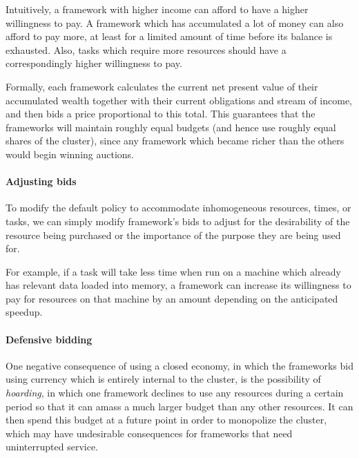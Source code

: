 \documentclass{acm_proc_article-sp}
\begin{document}
Intuitively, a framework with higher income can afford to have a higher
willingness to pay. A framework which has accumulated a lot of money can also
afford to pay more, at least for a limited amount of time before its balance is
exhausted. Also, tasks which require more resources should have a
correspondingly higher willingness to pay.

Formally, each framework calculates the current net present value
of their accumulated wealth together with their current obligations
and stream of income, and then bids a price proportional
to this total. This guarantees that the frameworks will
maintain roughly equal budgets (and hence use roughly equal shares
of the cluster), since any framework which became richer
than the others would begin winning auctions.

\paragraph{Adjusting bids} To modify the 
default policy to accommodate inhomogeneous resources,
times, or tasks, we can simply modify framework's
bids to adjust for the desirability of the resource being
purchased or the importance of the purpose they are being used for.

For example, if a task will take less time when run on a machine
which already has relevant data loaded into memory,
a framework can increase its willingness to pay for resources on that machine
by an amount depending on the anticipated speedup.

\paragraph{Defensive bidding} One negative consequence of using a closed economy,
in which the frameworks bid using currency which is entirely internal to the cluster,
is the possibility of \emph{hoarding}, in which one framework
declines to use any resources during a certain period so that it can amass
a much larger budget than any other resources.
It can then spend this budget at a future point in order to monopolize the cluster,
which may have undesirable consequences for frameworks that need uninterrupted service.
\end{document}
